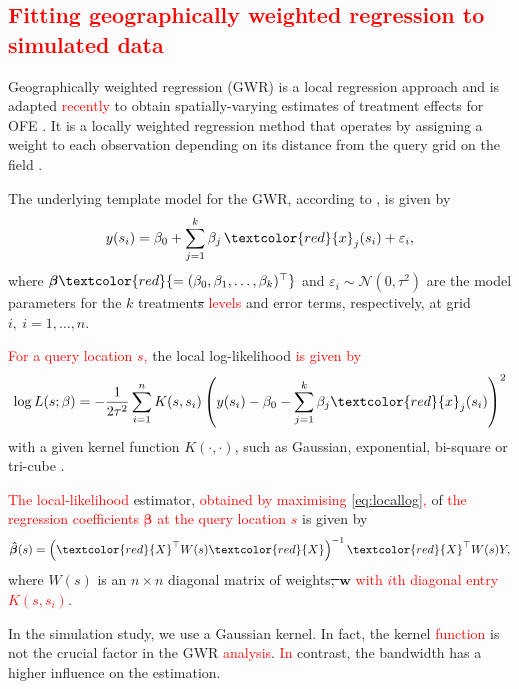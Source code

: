 \documentclass[a4paper]{article} 	%
\newcommand{\N}{\mathcal{N}}
\newcommand{\revision}[1]{\textcolor{red}{#1}}
\begin{document}
\subsection{\revision{Fitting geographically weighted regression to simulated data}}\label{sec:gwr}

Geographically weighted regression (GWR) is a local regression approach and is adapted \revision{recently} to obtain spatially-varying estimates of treatment effects for OFE \parencite{Rakshit2020Novel}.  It is a locally weighted regression method that operates by assigning a weight to each observation depending on its distance from the query grid on the field \parencite{Paez2002General}. 


The underlying template model for the GWR, according to \textcite{Leung2000Statistical}, is given by 
\begin{equation}\label{eq:basicgwr}
	y(s_i) = \beta_0 + \sum_{j=1}^{k} \beta_j \, \revision{x}_j(s_i) + \varepsilon_i, 
\end{equation}
where $\bm{\beta}\revision{ = (\beta_0, \beta_{1}, \ldots, \beta_{k})^{\top}}$ and $\varepsilon_{i} \sim \N(0,\tau^2)$ are the model parameters for the $k$ treatment\st{s} \revision{levels} and error terms, respectively, at grid $i,\ i=1,\ldots,n$. 

\revision{For a query location $s$,} the local log-likelihood \revision{is given by} 
\begin{eqnarray}\label{eq:locallog}
	\log L(s;\beta) = - \frac{1}{2\tau^2}\sum_{i=1}^{n}K(s,s_i)\left( y(s_i) -\beta_0 - \sum_{j=1}^{k}\beta_j \revision{x}_j(s_i) \right)^2 
\end{eqnarray}
with a given kernel function $K(\cdot,\cdot)$, such as Gaussian, exponential, bi-square or tri-cube \parencite{Gollini2015GWmodel}. 

\revision{The local-likelihood} estimator,  \revision{obtained by maximising \eqref{eq:locallog},} of \revision{the regression coefficients $\bm{\beta}$ at the query location $s$} is given by  
\begin{eqnarray}\label{eq:betahat}
	\bm{\hat{\beta}}(s) = \left( \revision{X}^\top W(s) \revision{X} \right)^{-1}\revision{X}^\top W(s) Y,
\end{eqnarray}
where $W(s)$ is an $n\times n$ diagonal matrix of weights\st{, $\bm{w}$} \revision{with $i$th diagonal entry $K(s,s_i)$}. 


In the simulation study, we use a Gaussian kernel. In fact, the kernel \revision{function} is not the crucial factor in the GWR \revision{analysis}. \revision{In} contrast, the bandwidth has a higher influence on the estimation. 
\end{document}
